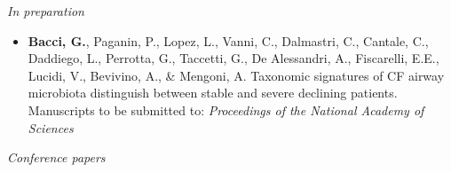 \textit{In preparation}

\begin{itemize}


\item \textbf{Bacci, G.}, Paganin, P., Lopez, L., Vanni, C., Dalmastri, C., Cantale, C., Daddiego, L., Perrotta, G., Taccetti, G., De Alessandri, A., Fiscarelli, E.E., Lucidi, V., Bevivino, A., \& Mengoni, A. Taxonomic signatures of CF airway microbiota distinguish between stable and severe declining patients. Manuscripts to be  submitted to: \textit{Proceedings of the National Academy of Sciences}


\end{itemize}


\textit{Conference papers}

